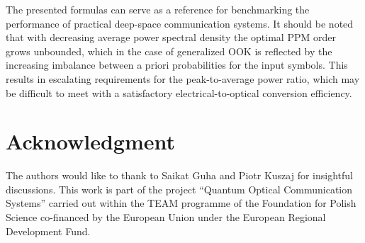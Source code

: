 \documentclass[conference]{IEEEtran}
\begin{document}
The presented formulas can serve as a reference for benchmarking the performance of practical deep-space communication systems. It should be noted that with decreasing average power spectral density the optimal PPM order grows unbounded, which in the case of generalized OOK is reflected by the increasing imbalance between a priori probabilities for the input symbols. This results in escalating requirements for the peak-to-average power ratio, which may be difficult to meet with a satisfactory electrical-to-optical conversion efficiency.




\section*{Acknowledgment}


The authors would like to thank to Saikat Guha and Piotr Kuszaj for insightful discussions. This work is part of the project ``Quantum Optical Communication Systems'' carried out within the TEAM
programme of the Foundation for Polish Science co-financed by the European Union under the European
Regional Development Fund.






\end{document}
